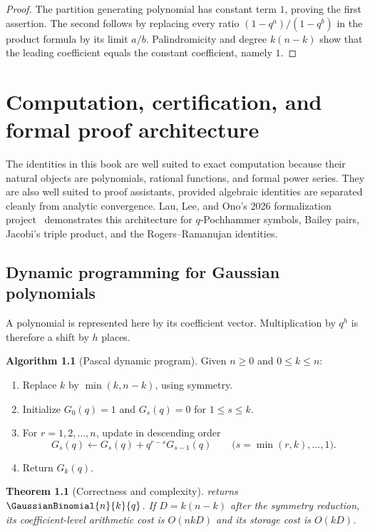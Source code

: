 \documentclass[11pt,a4paper,oneside,openany]{book}
\newtheorem{theorem}{Theorem}[chapter]
\theoremstyle{definition}
\newtheorem{algorithm}[algorithm]{Algorithm}
\theoremstyle{remark}
\begin{document}
\begin{proof}
The partition generating polynomial has constant term $1$, proving the first assertion.  The second follows by replacing every ratio $(1-q^a)/(1-q^b)$ in the product formula by its limit $a/b$.  Palindromicity and degree $k(n-k)$ show that the leading coefficient equals the constant coefficient, namely $1$.
\end{proof}

\chapter{Computation, certification, and formal proof architecture}\label{chap:formalization}

The identities in this book are well suited to exact computation because their natural objects are polynomials, rational functions, and formal power series.  They are also well suited to proof assistants, provided algebraic identities are separated cleanly from analytic convergence.  Lau, Lee, and Ono's 2026 formalization project~\cite{LauLeeOno2026} demonstrates this architecture for $q$-Pochhammer symbols, Bailey pairs, Jacobi's triple product, and the Rogers--Ramanujan identities.

\section{Dynamic programming for Gaussian polynomials}

A polynomial is represented here by its coefficient vector.  Multiplication by $q^h$ is therefore a shift by $h$ places.

\begin{algorithm}[Pascal dynamic program]\label{alg:gaussian-dp}
Given $n\ge0$ and $0\le k\le n$:
\begin{enumerate}
\item Replace $k$ by $\min(k,n-k)$, using symmetry.
\item Initialize $G_0(q)=1$ and $G_s(q)=0$ for $1\le s\le k$.
\item For $r=1,2,\ldots,n$, update in descending order
\[
 G_s(q)\leftarrow G_s(q)+q^{r-s}G_{s-1}(q)
 \qquad
 \bigl(s=\min(r,k),\ldots,1\bigr).
\]
\item Return $G_k(q)$.
\end{enumerate}
\end{algorithm}

\begin{theorem}[Correctness and complexity]\label{thm:gaussian-dp-correct}
 returns $\GaussianBinomial{n}{k}{q}$.  If $D=k(n-k)$ after the symmetry reduction, its coefficient-level arithmetic cost is $O(nkD)$ and its storage cost is $O(kD)$.
\end{theorem}
\end{document}
